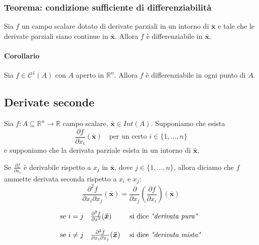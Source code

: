 \documentclass[x11names]{article}
\begin{document}
	\begin{center}
		\colorbox{myred}{\begin{minipage}{5.75in}
				\begin{redes}{}
					\subsubsection{Teorema: condizione sufficiente di differenziabilità}
					Sia \(f\) un campo scalare dotato di derivate parziali in un intorno di \(\boldsymbol{\bar{x}}\) e tale che le derivate parziali siano continue in \(\boldsymbol{\bar{x}}\). Allora \(f\) è differenziabile in \(\boldsymbol{\bar{x}}\).
				\end{redes}
		\end{minipage}}        
	\end{center}
	
	
	\paragraph{Corollario} Sia \(f\in\mathcal{C}^1(A)\) con \(A\) aperto in \(\mathbb{R}^n\). Allora \(f\) è differenziabile in ogni punto di \(A\).
	
	
	
	\subsection{Derivate seconde}
	Sia \(f:A\subseteq \mathbb{R}^n \to \mathbb{R}\) campo scalare, \(\boldsymbol{\bar{x}} \in Int(A)\). Supponiamo che esista
	\[ 
	\frac{\partial f}{\partial x_{i}}(\boldsymbol{\bar{x}}) \quad \text{per un certo } i\in\{1,\dots,n\}
	\]
	e supponiamo che la derivata parziale esista in un intorno di \(\boldsymbol{\bar{x}}\).
	
	Se \(\frac{\partial f}{\partial x_{i}}\) è derivabile rispetto a \(x_{j}\) in \(\boldsymbol{\bar{x}}\), dove \(j\in\{1,\dots,n\}\), allora diciamo che \(f\) ammette derivata seconda rispetto a \(x_{i}\) e \(x_{j}\):
	\[ 
	\frac{\partial^2f}{\partial x_{i} \partial x_{j}}(\boldsymbol{\bar{x}}) = \frac{\partial}{\partial x_{j}}\left(\frac{\partial f}{\partial x_{i}}\right)(\boldsymbol{\bar{x}})
	\]
	
	\[ 
	\begin{array}{lll}
		\text{se } i = j & \frac{\partial ^2 f}{\partial x^2}(\boldsymbol{\bar{x}}) & \text{ si dice \textit{"derivata pura"}} \\ & & \\
		\text{se } i \neq j & \frac{\partial ^2 f}{\partial x_{i}\partial x_{j}}(\boldsymbol{\bar{x}}) & \text{ si dice \textit{"derivata mista"}} \\
	\end{array}
	\]
\end{document}
